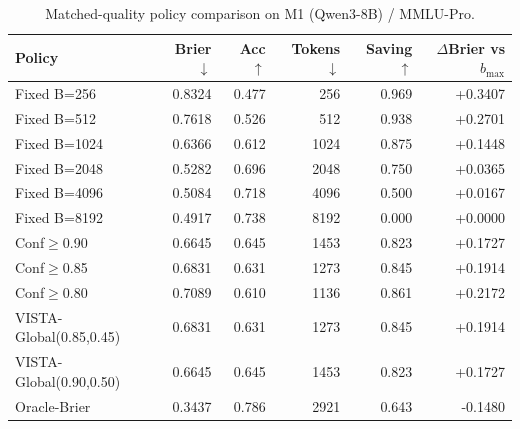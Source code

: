 \begin{table}[ht]
\centering
\small
\begin{tabular}{lrrrrr}
\toprule
Policy & Brier $\downarrow$ & Acc $\uparrow$ & Tokens $\downarrow$ & Saving $\uparrow$ & $\Delta$Brier vs $b_{\max}$ \\
\midrule
Fixed B=256 & 0.8324 & 0.477 & 256 & 0.969 & +0.3407 \\
Fixed B=512 & 0.7618 & 0.526 & 512 & 0.938 & +0.2701 \\
Fixed B=1024 & 0.6366 & 0.612 & 1024 & 0.875 & +0.1448 \\
Fixed B=2048 & 0.5282 & 0.696 & 2048 & 0.750 & +0.0365 \\
Fixed B=4096 & 0.5084 & 0.718 & 4096 & 0.500 & +0.0167 \\
Fixed B=8192 & 0.4917 & 0.738 & 8192 & 0.000 & +0.0000 \\
Conf$\geq$0.90 & 0.6645 & 0.645 & 1453 & 0.823 & +0.1727 \\
Conf$\geq$0.85 & 0.6831 & 0.631 & 1273 & 0.845 & +0.1914 \\
Conf$\geq$0.80 & 0.7089 & 0.610 & 1136 & 0.861 & +0.2172 \\
VISTA-Global(0.85,0.45) & 0.6831 & 0.631 & 1273 & 0.845 & +0.1914 \\
VISTA-Global(0.90,0.50) & 0.6645 & 0.645 & 1453 & 0.823 & +0.1727 \\
Oracle-Brier & 0.3437 & 0.786 & 2921 & 0.643 & -0.1480 \\
\bottomrule
\end{tabular}
\caption{Matched-quality policy comparison on M1 (Qwen3-8B) / MMLU-Pro.}
\label{tab:a09_matched_quality}
\end{table}